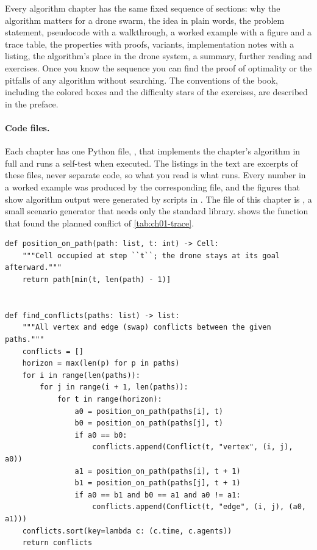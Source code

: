 Every algorithm chapter has the same fixed sequence of sections: why the algorithm
matters for a drone swarm, the idea in plain words, the problem statement, pseudocode
with a walkthrough, a worked example with a figure and a trace table, the properties
with proofs, variants, implementation notes with a listing, the algorithm's place in
the drone system, a summary, further reading and exercises. Once you know the sequence
you can find the proof of optimality or the pitfalls of any algorithm without
searching. The conventions of the book, including the
colored boxes and the difficulty stars of the exercises, are described in the
preface.

\paragraph{Code files.}
Each chapter has one Python file, , that implements the
chapter's algorithm in full and runs a self-test when executed. The listings in the
text are excerpts of these files, never separate code, so what you read is what runs.
Every number in a worked example was produced by the corresponding file, and the
figures that show algorithm output were generated by scripts in
. The file of this chapter is , a
small scenario generator that needs only the standard library. 
shows the function that found the planned conflict of \cref{tab:ch01-trace}.

\begin{lstlisting}[caption={Finding the planned conflicts of a set of time-indexed paths (from \code{code/ch01\_scenario.py}). A drone that has reached its goal stays there, which \code{position\_on\_path} implements by clamping the time index. The two functions are not adjacent in the file: the \code{Conflict} record type and the helper \code{cell\_center} sit between them and are omitted here, and the type alias \code{Cell} is defined earlier, so copy the excerpt from the file rather than from the page.},label={lst:ch01-conflicts}]
def position_on_path(path: list, t: int) -> Cell:
    """Cell occupied at step ``t``; the drone stays at its goal afterward."""
    return path[min(t, len(path) - 1)]


def find_conflicts(paths: list) -> list:
    """All vertex and edge (swap) conflicts between the given paths."""
    conflicts = []
    horizon = max(len(p) for p in paths)
    for i in range(len(paths)):
        for j in range(i + 1, len(paths)):
            for t in range(horizon):
                a0 = position_on_path(paths[i], t)
                b0 = position_on_path(paths[j], t)
                if a0 == b0:
                    conflicts.append(Conflict(t, "vertex", (i, j), a0))
                a1 = position_on_path(paths[i], t + 1)
                b1 = position_on_path(paths[j], t + 1)
                if a0 == b1 and b0 == a1 and a0 != a1:
                    conflicts.append(Conflict(t, "edge", (i, j), (a0, a1)))
    conflicts.sort(key=lambda c: (c.time, c.agents))
    return conflicts
\end{lstlisting}

